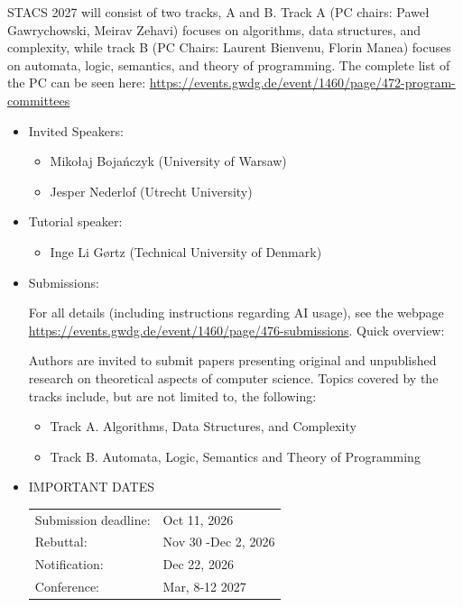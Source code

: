\documentclass[prodmode,acmtecs]{acmsmall} %
\begin{document}
  STACS 2027 will consist of two tracks, A and B. Track A (PC chairs: Paweł Gawrychowski, Meirav Zehavi) focuses on algorithms, data structures, and complexity, while track B (PC Chairs: Laurent Bienvenu, Florin Manea) focuses on automata, logic, semantics, and theory of programming. The complete list of the PC can be seen here: \href{https://events.gwdg.de/event/1460/page/472-program-committees}{https://events.gwdg.de/event/1460/page/472-program-committees}\\ 
\begin{itemize}\item  Invited Speakers: 
 
\begin{itemize}\item  Mikołaj Bojańczyk (University of Warsaw)
\item  Jesper Nederlof (Utrecht University)
\end{itemize} 
\item  Tutorial speaker: 
 
\begin{itemize}\item  Inge Li Gørtz (Technical University of Denmark)
\end{itemize} 
\item  Submissions: 
 
  For all details (including instructions regarding AI usage), see the webpage \href{https://events.gwdg.de/event/1460/page/476-submissions}{https://events.gwdg.de/event/1460/page/476-submissions}. Quick overview: 
 
  Authors are invited to submit papers presenting original and unpublished research on theoretical aspects of computer science. Topics covered by the tracks include, but are not limited to, the following:                    
 
\begin{itemize}\item  Track A. Algorithms, Data Structures, and Complexity                         
\item  Track B. Automata, Logic, Semantics and Theory of Programming
\end{itemize} 
\item  IMPORTANT DATES 
 
\begin{tabulary}{\linewidth}{LL}Submission deadline:  & Oct 11, 2026 \\
Rebuttal:  & Nov 30 -Dec 2, 2026 \\
Notification:  & Dec 22, 2026 \\
Conference:  & Mar, 8-12 2027 \\
\end{tabulary}
 

\end{itemize}
\end{document}
